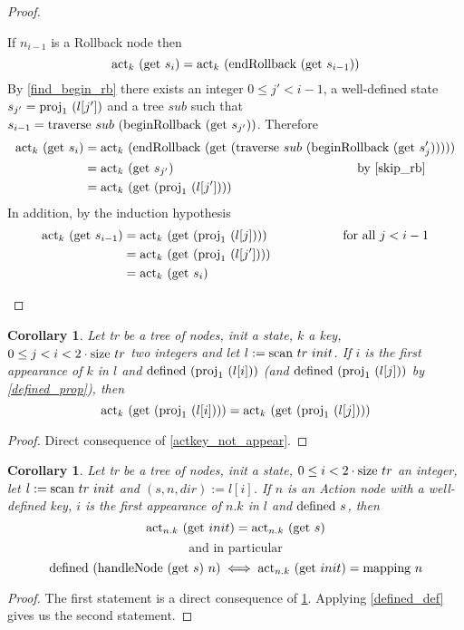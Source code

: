 \documentclass{article}
\newtheorem{corollary}[lemma]{Corollary}
\newcommand{\textfun}[1]{\textup{#1}}
\newcommand{\traverse}[2]{\textfun{traverse}\ #1\ #2}
\newcommand{\scan}[2]{\textfun{scan}\ #1\ #2}
\newcommand{\hNode}[2]{\textfun{handleNode}\ #1\ #2}
\newcommand{\beginRb}[1]{\textfun{beginRollback}\ #1}
\newcommand{\enRb}[1]{\textfun{endRollback}\ #1}
\newcommand{\defined}[1]{\textfun{defined}\ #1}
\newcommand{\get}[1]{\textfun{get}\ #1}
\newcommand{\mapping}[1]{\textfun{mapping}\ #1}
\newcommand{\size}[1]{\textfun{size}\ #1}
\newcommand{\fst}[1]{\textfun{proj}_1\ #1}
\newcommand{\actkey}[2]{\textfun{act}_{#1}\ #2}
\begin{document}
\begin{proof}
\begin{itemize}
        If $n_{i - 1}$ is a Rollback node then
        \[\actkey{k}{(\get{s_i})} = \actkey{k}{(\enRb{(\get{s_{i - 1}})})} \]
        By \cref{find_begin_rb} there exists an integer $0 \leq j' < i - 1$, a well-defined state $s_{j'} = \fst{(l[j'])}$ and a tree $sub$ such that $s_{i - 1} = \traverse{sub}{(\beginRb{(\get{s_{j'}})})}$. Therefore
        \begin{align*}
            \actkey{k}{(\get{s_i})} &= \actkey{k}{(\enRb{(\get{(\traverse{sub}{(\beginRb{(\get{s_j'})})})})})} \\
            &= \actkey{k}{(\get{s_{j'}})} \text{\hskip 14.5em by \cref{skip_rb}} \\
            &= \actkey{k}{(\get{(\fst{(l[j'])})})}
        \end{align*}
        In addition, by the induction hypothesis
        \begin{align*}
        \actkey{k}{(\get{s_{i - 1}})} &= \actkey{k}{(\get{(\fst{(l[j])})})} \text{\hskip 6em for all $j < i - 1$} \\
        &= \actkey{k}{(\get{(\fst{(l[j'])})})} \\
        &= \actkey{k}{(\get{s_i})}
        \end{align*}
    \end{itemize} 
    
\end{proof}

\begin{corollary}
    \label{actkey_first_appear}
    Let tr be a tree of nodes, init a state, $k$ a key, $0 \leq j < i < 2\cdot \size{tr}$ two integers and let $l := \scan{tr}{init}$. 
    If $i$ is the first appearance of $k$ in $l$ and $\defined{(\fst{(l[i])})}$ (and  $\defined{(\fst{(l[j])})}$ by \cref{defined_prop}), then 
    \[\actkey{k}{(\get{(\fst{(l[i])})})} = \actkey{k}{(\get{(\fst{(l[j])})})}\]
\end{corollary}
\begin{proof}
    Direct consequence of \cref{actkey_not_appear}.
\end{proof}

\begin{corollary}
    \label{defined_first_appear}
    Let tr be a tree of nodes, init a state, $0 \leq i < 2\cdot \size{tr}$ an integer, let $l := \scan{tr}{init}$ and $(s, n, dir) := l[i]$. 
    If $n$ is an Action node with a well-defined key, $i$ is the first appearance of $n.k$ in $l$ and $\defined{s}$, then 
    \[\actkey{n.k}{(\get{init})} = \actkey{n.k}{(\get{s})}\]
    \[\text{and in particular}\] 
    \[\defined{(\hNode{(\get{s})}{n})} \iff \actkey{n.k}{(\get{init})} = \mapping{n}\]
\end{corollary}
\begin{proof}
    The first statement is a direct consequence of \cref{actkey_first_appear}. Applying \cref{defined_def} gives us the second statement.
\end{proof}
\end{document}
